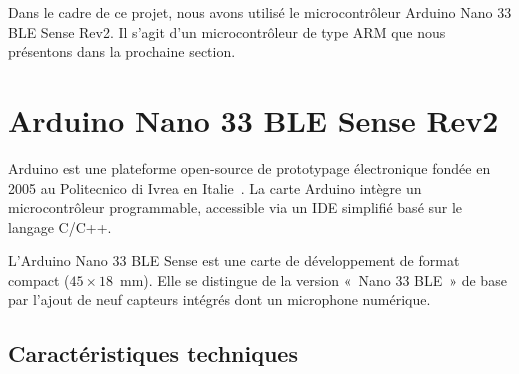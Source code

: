 \documentclass[a4paper,12pt,twoside]{report}
\theoremstyle{definition}
\theoremstyle{plain}
\theoremstyle{remark}
\begin{document}
Dans le cadre de ce projet, nous avons utilisé le microcontrôleur Arduino Nano 33 BLE
Sense Rev2. Il s'agit d'un microcontrôleur de type \ac{ARM} que nous présentons dans la
prochaine section.

\section{Arduino Nano 33 BLE Sense Rev2}

Arduino est une plateforme open-source de prototypage électronique fondée en 2005 au
Politecnico di Ivrea en Italie~\cite{arduino_nano33}. La carte Arduino intègre un
microcontrôleur programmable, accessible via un \ac{IDE} simplifié basé sur le langage C/C++.

L'Arduino Nano 33 BLE Sense est une carte de développement de format compact
($45 \times 18$~mm). Elle se distingue de la version «~Nano 33 BLE~» de base par l'ajout
de neuf capteurs intégrés dont un microphone numérique.

\subsection*{Caractéristiques techniques}
\end{document}
